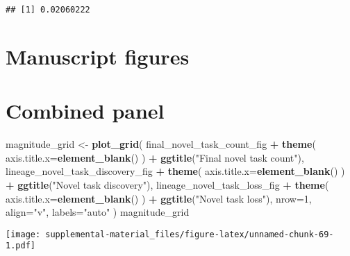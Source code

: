 \documentclass[]{book}
\newenvironment{Shaded}{\begin{snugshade}}{\end{snugshade}}
\newcommand{\DataTypeTok}[1]{\textcolor[rgb]{0.13,0.29,0.53}{#1}}
\newcommand{\DecValTok}[1]{\textcolor[rgb]{0.00,0.00,0.81}{#1}}
\newcommand{\KeywordTok}[1]{\textcolor[rgb]{0.13,0.29,0.53}{\textbf{#1}}}
\newcommand{\NormalTok}[1]{#1}
\newcommand{\OperatorTok}[1]{\textcolor[rgb]{0.81,0.36,0.00}{\textbf{#1}}}
\newcommand{\StringTok}[1]{\textcolor[rgb]{0.31,0.60,0.02}{#1}}
\begin{document}
\begin{verbatim}
## [1] 0.02060222
\end{verbatim}

\hypertarget{manuscript-figures-1}{%
\section{Manuscript figures}\label{manuscript-figures-1}}

\hypertarget{combined-panel}{%
\section{Combined panel}\label{combined-panel}}

\begin{Shaded}
\begin{Highlighting}[]
\NormalTok{magnitude_grid <-}\StringTok{ }\KeywordTok{plot_grid}\NormalTok{(}
\NormalTok{  final_novel_task_count_fig }\OperatorTok{+}
\StringTok{    }\KeywordTok{theme}\NormalTok{(}
      \DataTypeTok{axis.title.x=}\KeywordTok{element_blank}\NormalTok{()}
\NormalTok{    ) }\OperatorTok{+}
\StringTok{    }\KeywordTok{ggtitle}\NormalTok{(}\StringTok{"Final novel task count"}\NormalTok{),}
\NormalTok{  lineage_novel_task_discovery_fig }\OperatorTok{+}
\StringTok{    }\KeywordTok{theme}\NormalTok{(}
      \DataTypeTok{axis.title.x=}\KeywordTok{element_blank}\NormalTok{()}
\NormalTok{    ) }\OperatorTok{+}
\StringTok{    }\KeywordTok{ggtitle}\NormalTok{(}\StringTok{"Novel task discovery"}\NormalTok{),}
\NormalTok{  lineage_novel_task_loss_fig }\OperatorTok{+}
\StringTok{    }\KeywordTok{theme}\NormalTok{(}
      \DataTypeTok{axis.title.x=}\KeywordTok{element_blank}\NormalTok{()}
\NormalTok{    ) }\OperatorTok{+}
\StringTok{    }\KeywordTok{ggtitle}\NormalTok{(}\StringTok{"Novel task loss"}\NormalTok{),}
  \DataTypeTok{nrow=}\DecValTok{1}\NormalTok{,}
  \DataTypeTok{align=}\StringTok{"v"}\NormalTok{,}
  \DataTypeTok{labels=}\StringTok{"auto"}
\NormalTok{)}
\NormalTok{magnitude_grid}
\end{Highlighting}
\end{Shaded}

\texttt{[image: supplemental-material\_files/figure-latex/unnamed-chunk-69-1.pdf]}
\end{document}
